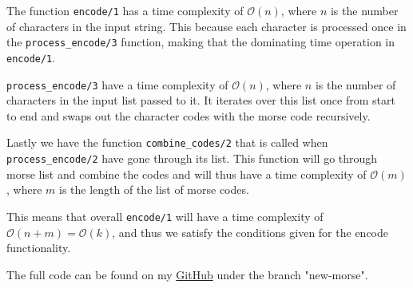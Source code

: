 \documentclass[a4paper,11pt]{article}
\begin{document}
The function {\tt encode/1} has a time complexity of $\mathcal{O}(n)$, where $n$ is the number of characters in the input string. This because 
each character is processed once in the {\tt process\_encode/3} function, making that the dominating time operation in {\tt encode/1}.

{\tt process\_encode/3} have a time complexity of $\mathcal{O}(n)$, where $n$ is the number of characters in the input list passed to it. It 
iterates over this list once from start to end and swaps out the character codes with the morse code recursively.

Lastly we have the function {\tt combine\_codes/2} that is called when {\tt process\_encode/2} have gone through its list. This function will 
go through morse list and combine the codes and will thus have a time complexity of $\mathcal{O}(m)$, where $m$ is the length of the list of 
morse codes.

This means that overall {\tt encode/1} will have a time complexity of \\$\mathcal{O}(n+m) = \mathcal{O}(k)$, and thus we satisfy the conditions
given for the encode functionality.

The full code can be found on my \href{https://github.com/adrian-jonsson-sjoedin/ID1019-Programming-II/tree/main/Task1_Solution}{GitHub} under 
the branch "new-morse".
\end{document}

